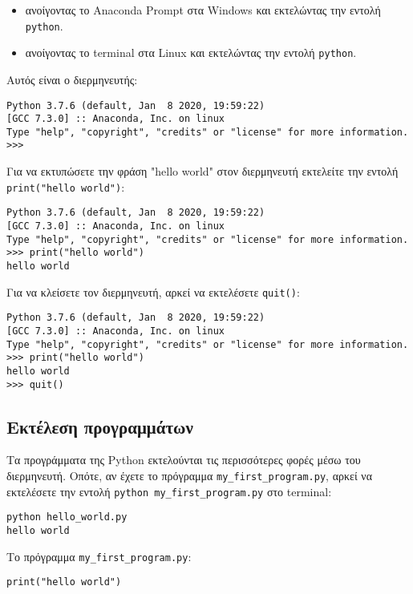 \documentclass[14pt]{extreport}
\begin{document}
\begin{itemize}
    \itemsep0cm
    \item ανοίγοντας το Anaconda Prompt στα Windows και εκτελώντας την εντολή \lstinline{python}.
    \item ανοίγοντας το terminal στα Linux και εκτελώντας την εντολή \lstinline{python}.
\end{itemize}

Αυτός είναι ο διερμηνευτής:

\begin{lstlisting}[numbers=none]
Python 3.7.6 (default, Jan  8 2020, 19:59:22) 
[GCC 7.3.0] :: Anaconda, Inc. on linux
Type "help", "copyright", "credits" or "license" for more information.
>>> 
\end{lstlisting}

Για να εκτυπώσετε την φράση "hello world" στον διερμηνευτή εκτελείτε την εντολή \lstinline{print("hello world")}:
\begin{lstlisting}[numbers=none]
Python 3.7.6 (default, Jan  8 2020, 19:59:22) 
[GCC 7.3.0] :: Anaconda, Inc. on linux
Type "help", "copyright", "credits" or "license" for more information.
>>> print("hello world")
hello world
\end{lstlisting}

Για να κλείσετε τον διερμηνευτή, αρκεί να εκτελέσετε \lstinline{quit()}:

\begin{lstlisting}[numbers=none]
Python 3.7.6 (default, Jan  8 2020, 19:59:22) 
[GCC 7.3.0] :: Anaconda, Inc. on linux
Type "help", "copyright", "credits" or "license" for more information.
>>> print("hello world")
hello world
>>> quit()
\end{lstlisting}

\subsection{Εκτέλεση προγραμμάτων}

Τα προγράμματα της Python εκτελούνται τις περισσότερες φορές μέσω του διερμηνευτή. Οπότε, αν έχετε το πρόγραμμα \lstinline{my_first_program.py}, αρκεί να εκτελέσετε την εντολή \lstinline{python my_first_program.py} στο terminal:

\begin{lstlisting}[numbers=none]
python hello_world.py
hello world    
\end{lstlisting}

Το πρόγραμμα \lstinline{my_first_program.py}:
\begin{lstlisting}
print("hello world")
\end{lstlisting}
\end{document}
